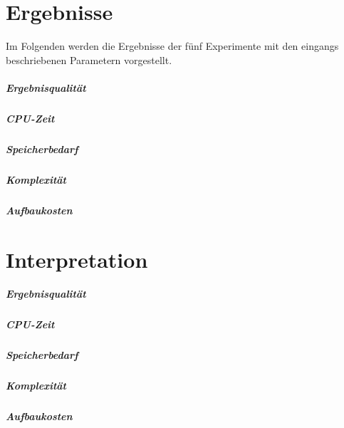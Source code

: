 \section{Ergebnisse}\label{sec:ergebnisse}
Im Folgenden werden die Ergebnisse der fünf Experimente mit den eingangs beschriebenen Parametern vorgestellt. 
\subparagraph*{Ergebnisqualität}
\subparagraph*{CPU-Zeit}
\subparagraph*{Speicherbedarf}
\subparagraph*{Komplexität}
\subparagraph*{Aufbaukosten}
\section{Interpretation}\label{sec:interpretation}
\subparagraph*{Ergebnisqualität}
\subparagraph*{CPU-Zeit}
\subparagraph*{Speicherbedarf}
\subparagraph*{Komplexität}
\subparagraph*{Aufbaukosten}